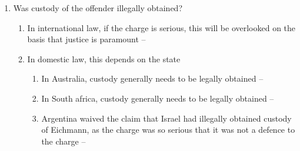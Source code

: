 \begin{enumerate}
\begin{enumerate}
        \item Was custody of the offender illegally obtained?
        \begin{enumerate}
            \item In international law, if the charge is serious, this will be overlooked on the basis that justice is paramount -- 
            \item In domestic law, this depends on the state
            \begin{enumerate}
                \item In Australia, custody generally needs to be legally obtained -- 
                \item In South africa, custody generally needs to be legally obtained -- 
                \item Argentina waived the claim that Israel had illegally obtained custody of Eichmann, as the charge was so serious that it was not a defence to the charge -- 
            \end{enumerate}
        \end{enumerate}
    \end{enumerate}
\end{enumerate}

